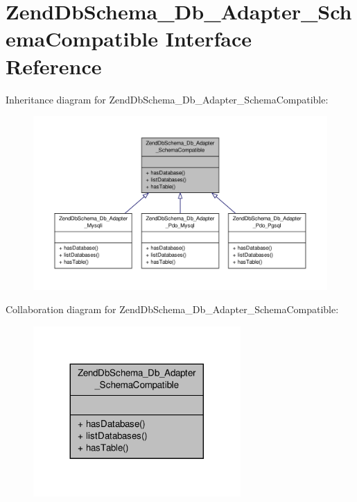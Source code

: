 \hypertarget{interfaceZendDbSchema__Db__Adapter__SchemaCompatible}{\section{Zend\-Db\-Schema\-\_\-\-Db\-\_\-\-Adapter\-\_\-\-Schema\-Compatible Interface Reference}
\label{interfaceZendDbSchema__Db__Adapter__SchemaCompatible}
}


Inheritance diagram for Zend\-Db\-Schema\-\_\-\-Db\-\_\-\-Adapter\-\_\-\-Schema\-Compatible\-:\nopagebreak
\begin{figure}[H]
\begin{center}
\leavevmode
\includegraphics[width=350pt]{interfaceZendDbSchema__Db__Adapter__SchemaCompatible__inherit__graph}
\end{center}
\end{figure}


Collaboration diagram for Zend\-Db\-Schema\-\_\-\-Db\-\_\-\-Adapter\-\_\-\-Schema\-Compatible\-:\nopagebreak
\begin{figure}[H]
\begin{center}
\leavevmode
\includegraphics[width=224pt]{interfaceZendDbSchema__Db__Adapter__SchemaCompatible__coll__graph}
\end{center}
\end{figure}
